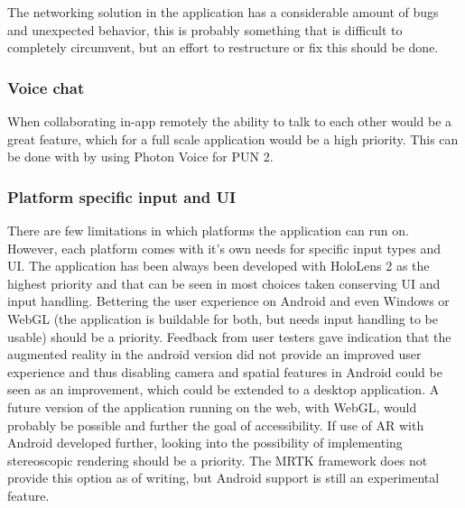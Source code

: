 The networking solution in the application has a considerable amount of bugs and unexpected behavior, this is probably something that is difficult to completely circumvent, but an effort to restructure or fix this should be done.


\subsubsection*{Voice chat}

When collaborating in-app remotely the ability to talk to each other would be a great feature, which for a full scale application would be a high priority. 
This can be done with by using Photon Voice for PUN 2.

\subsubsection*{Platform specific input and UI}
There are few limitations in which platforms the application can run on. However, each platform comes with it's own needs for specific input types and UI. The application has been always been developed with HoloLens 2 as the highest priority and that can be seen in most choices taken conserving UI and input handling. Bettering the user experience on Android and even Windows or WebGL (the application is buildable for both, but needs input handling to be usable) should be a priority. Feedback from user testers gave indication that the augmented reality in the android version did not provide an improved user experience and thus disabling camera and spatial features in Android could be seen as an improvement, which could be extended to a desktop application.
A future version of the application running on the web, with WebGL, would probably be possible and further the goal of accessibility. If use of AR with Android developed further, looking into the possibility of implementing stereoscopic rendering should be a priority. The MRTK framework does not provide this option as of writing, but Android support is still an experimental feature. 












